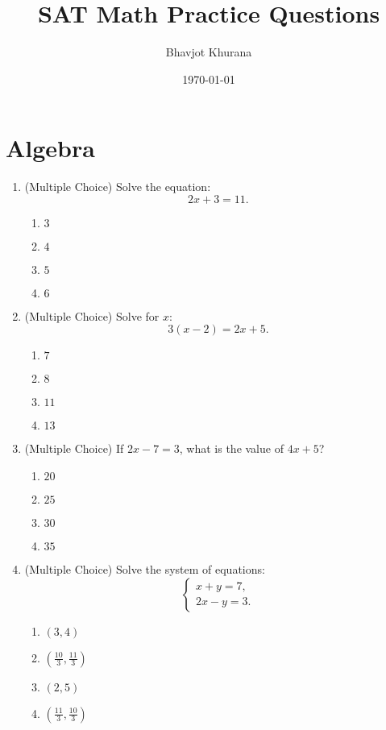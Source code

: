 \documentclass[12pt]{article}
\begin{document}
\title{SAT Math Practice Questions}
\author{Bhavjot Khurana}
\date{\today}
\maketitle
\tableofcontents
\newpage

\section{Algebra}
\begin{enumerate}[label=\textbf{Question \arabic*:}]
  \item (Multiple Choice) Solve the equation:
    \[
    2x + 3 = 11.
    \]
    \begin{enumerate}[label=(\Alph*)]
      \item $3$
      \item $4$
      \item $5$
      \item $6$
    \end{enumerate}
    
  \item (Multiple Choice) Solve for \( x \):
    \[
    3(x - 2) = 2x + 5.
    \]
    \begin{enumerate}[label=(\Alph*)]
      \item \(7\)
      \item \(8\)
      \item \(11\)
      \item \(13\)
    \end{enumerate}
    
  \item (Multiple Choice) If \( 2x - 7 = 3 \), what is the value of \( 4x + 5 \)?
    \begin{enumerate}[label=(\Alph*)]
      \item \(20\)
      \item \(25\)
      \item \(30\)
      \item \(35\)
    \end{enumerate}
    
  \item (Multiple Choice) Solve the system of equations:
    \[
    \begin{cases}
      x + y = 7, \\
      2x - y = 3.
    \end{cases}
    \]
    \begin{enumerate}[label=(\Alph*)]
      \item \((3, 4)\)
      \item \(\left(\frac{10}{3}, \frac{11}{3}\right)\)
      \item \((2, 5)\)
      \item \(\left(\frac{11}{3}, \frac{10}{3}\right)\)
    \end{enumerate}
    

\end{enumerate}
\end{document}
